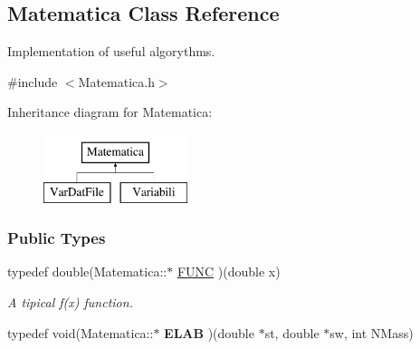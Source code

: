 \hypertarget{classMatematica}{\subsection{\-Matematica \-Class \-Reference}
\label{classMatematica}
}


\-Implementation of useful algorythms.  




{\ttfamily \#include $<$\-Matematica.\-h$>$}

\-Inheritance diagram for \-Matematica\-:\begin{figure}[H]
\begin{center}
\leavevmode
\includegraphics[height=2.000000cm]{classMatematica}
\end{center}
\end{figure}
\subsubsection*{\-Public \-Types}
\begin{DoxyCompactItemize}
\item 
\hypertarget{classMatematica_af3e0600f7cea754ca1ebefb85de3526b}{typedef double(\-Matematica\-::$\ast$ \hyperlink{classMatematica_af3e0600f7cea754ca1ebefb85de3526b}{\-F\-U\-N\-C} )(double x)}\label{classMatematica_af3e0600f7cea754ca1ebefb85de3526b}

\begin{DoxyCompactList}\small\item\em \-A tipical f(x) function. \end{DoxyCompactList}\item 
\hypertarget{classMatematica_a71f04c72c044751a72c3e605301a8b9d}{typedef void(\-Matematica\-::$\ast$ {\bfseries \-E\-L\-A\-B} )(double $\ast$st, double $\ast$sw, int \-N\-Mass)}\label{classMatematica_a71f04c72c044751a72c3e605301a8b9d}

\end{DoxyCompactItemize}
